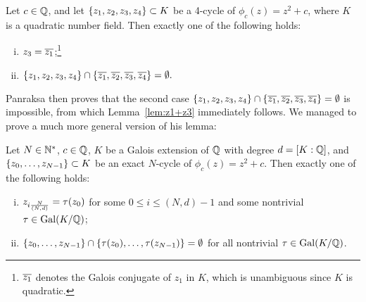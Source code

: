 \begin{theorem} 
  Let $c \in \mathbb{Q}$, and let $\left\{z_1, z_2, z_3, z_4\right\} \subset K$ be a
  4-cycle of $\phi_c(z) = z^2 + c$, where $K$ is a quadratic number
  field. Then exactly one of the following holds:
  \begin{enumerate}[(i)]
  \item $z_3 = \overline{z_1}$;\footnote{%
      $\overline{z_1}$ denotes the Galois conjugate of $z_1$ in $K$, which
      is unambiguous since $K$ is quadratic.}

  \item $\{z_1, z_2, z_3, z_4\} \cap \{\overline{z_1}, \overline{z_2}, \overline{z_3},
    \overline{z_4}\} =\emptyset.$
  \end{enumerate}
\end{theorem}

Panraksa then proves that the second case $\{z_1, z_2, z_3, z_4\} \cap
\{\overline{z_1}, \overline{z_2}, \overline{z_3}, \overline{z_4}\} = \emptyset$ is impossible, from
which Lemma~\ref{lem:z1+z3} immediately follows. We managed to prove a
much more general version of his lemma:


\begin{theorem}
  Let $N \in \mathbb{N}^*$, $c \in \mathbb{Q}$, $K$ be a Galois extension of $\mathbb{Q}$ with
  degree $d = [K : \mathbb{Q}]$, and $\left\{z_0, \dots, z_{N-1}\right\} \subset K$ be
  an exact $N$-cycle of $\phi_c(z) = z^2 + c$. Then exactly one of the
  following holds:
  \begin{enumerate}[(i)]
  \item $z_{i\frac{N}{(N, d)}} = \tau(z_0)$ for some $0 \le i \le (N, d)-1$ and some
    nontrivial $\tau \in \mathrm{Gal}(K/\mathbb{Q})$;

  \item $\left\{z_0, \dots, z_{N-1}\right\} \cap \left\{\tau(z_0), \dots,
      \tau(z_{N-1})\right\} = \emptyset$ for all nontrivial $\tau \in \mathrm{Gal}(K/\mathbb{Q})$.
  \end{enumerate}
\end{theorem}

